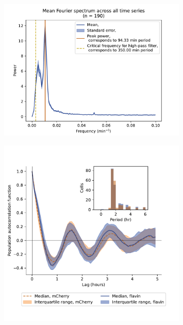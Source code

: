 \begin{figure}
  \centering
  \begin{subfigure}[htpb]{0.45\textwidth}
   \centering
   \includegraphics[width=\textwidth]{htb2mCherry_26643_14}
   \caption{
   }
   \label{fig:biology-highglc-sync-fourier}
  \end{subfigure}%
  \begin{subfigure}[htpb]{0.45\textwidth}
   \centering
   \includegraphics[width=\textwidth]{htb2mCherry_26643_12}
   \caption{
   }
   \label{fig:biology-highglc-sync-acf}
  \end{subfigure}


\end{figure}
